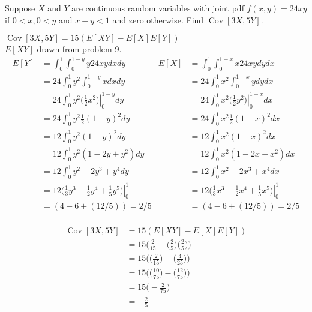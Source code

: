 \documentclass[answers]{exam}
\begin{document}
\begin{questions}
\clearpage
\question 
Suppose $X$ and $Y$ are continuous random variables with joint pdf \(f(x,y) = 24xy\)
if \(0<x,0<y\) and \(x+y<1\) and zero otherwise. Find \(\operatorname{Cov}[3X,5Y]\).
\begin{solution}
	\(\operatorname{Cov}[3X,5Y] = 15 (E[XY]-E[X]E[Y]) \) \\
	\(E[XY] \) drawn from problem 9.
	\begin{equation}
		\begin{aligned}
			E[Y]
			&= \int_{0}^{1}\int_{0}^{1-y} y 24 xy dx dy \\
			&= 24 \int_{0}^{1} y^2 \int_{0}^{1-y} x dx dy \\
			&= 24 \int_{0}^{1} y^2 \left.\bigg(\frac{1}{2}x^2\bigg)\right|_{0}^{1-y} dy \\
			&= 24 \int_{0}^{1} y^2 \frac{1}{2}(1-y)^2 dy \\
			&= 12 \int_{0}^{1} y^2(1-y)^2 dy \\
			&= 12 \int_{0}^{1} y^2(1-2y+y^2) dy \\
			&= 12 \int_{0}^{1} y^2-2y^3+y^4 dy \\
			&= \left. 12\bigg(\frac{1}{3}y^3-\frac{1}{2}y^4+\frac{1}{5}y^5\bigg) \right|_{0}^{1} \\
			&= (4-6+(12/5)) = 2/5
		\end{aligned}
		\begin{aligned}
			E[X]
			&= \int_{0}^{1}\int_{0}^{1-x} x 24 xy dy dx \\
			&= 24 \int_{0}^{1} x^2 \int_{0}^{1-x} y dy dx \\
			&= 24 \int_{0}^{1} x^2 \left.\bigg(\frac{1}{2}y^2\bigg)\right|_{0}^{1-x} dx \\
			&= 24 \int_{0}^{1} x^2 \frac{1}{2}(1-x)^2 dx \\
			&= 12 \int_{0}^{1} x^2(1-x)^2 dx \\
			&= 12 \int_{0}^{1} x^2(1-2x+x^2) dx \\
			&= 12 \int_{0}^{1} x^2-2x^3+x^4 dx \\
			&= \left. 12\bigg(\frac{1}{3}x^3-\frac{1}{2}x^4+\frac{1}{5}x^5\bigg) \right|_{0}^{1} \\
			&= (4-6+(12/5)) = 2/5
		\end{aligned}
	\end{equation} \\
	\begin{align*}
		\operatorname{Cov}[3X,5Y] &= 15 (E[XY]-E[X]E[Y]) \\
		&= 15\bigg(\frac{2}{15} - \bigg(\frac{2}{5}\bigg)\bigg(\frac{2}{5}\bigg) \bigg) \\
		&= 15\bigg(\bigg(\frac{2}{15}\bigg) - \bigg(\frac{4}{25}\bigg) \bigg) \\
		&= 15\bigg(\bigg(\frac{10}{75}\bigg) - \bigg(\frac{12}{75}\bigg) \bigg) \\
		&= 15\bigg(-\frac{2}{75}\bigg) \\
		&= -\frac{2}{5} 
	\end{align*}
\end{solution}


\end{questions}
\end{document}
